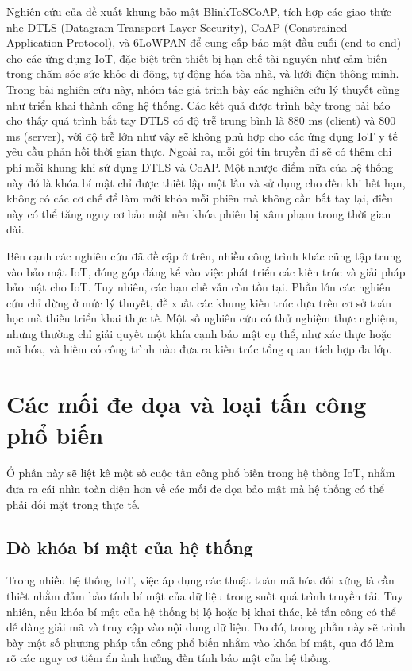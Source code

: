 Nghiên cứu của \cite{dtls} đề xuất khung bảo mật BlinkToSCoAP, tích hợp các giao thức nhẹ DTLS (Datagram Transport Layer Security), CoAP (Constrained Application Protocol), và 6LoWPAN để cung cấp bảo mật đầu cuối (end-to-end) cho các ứng dụng IoT, đặc biệt trên thiết bị hạn chế tài nguyên như cảm biến trong chăm sóc sức khỏe di động, tự động hóa tòa nhà, và lưới điện thông minh. Trong bài nghiên cứu này, nhóm tác giả trình bày các nghiên cứu lý thuyết cũng như triển khai thành công hệ thống. Các kết quả được trình bày trong bài báo cho thấy quá trình bắt tay DTLS có độ trễ trung bình là 880 ms (client) và 800 ms (server), với độ trễ lớn như vậy sẽ không phù hợp cho các ứng dụng IoT y tế yêu cầu phản hồi thời gian thực. Ngoài ra, mỗi gói tin truyền đi sẽ có thêm chi phí mỗi khung khi sử dụng DTLS và CoAP. Một nhược điểm nữa của hệ thống này đó là khóa bí mật chỉ được thiết lập một lần và sử dụng cho đến khi hết hạn, không có các cơ chế để làm mới khóa mỗi phiên mà không cần bắt tay lại, điều này có thể tăng nguy cơ bảo mật nếu khóa phiên bị xâm phạm trong thời gian dài. 

Bên cạnh các nghiên cứu đã đề cập ở trên, nhiều công trình khác cũng tập trung vào bảo mật IoT, đóng góp đáng kể vào việc phát triển các kiến trúc và giải pháp bảo mật cho IoT. Tuy nhiên, các hạn chế vẫn còn tồn tại. Phần lớn các nghiên cứu chỉ dừng ở mức lý thuyết, đề xuất các khung kiến trúc dựa trên cơ sở toán học mà thiếu triển khai thực tế. Một số nghiên cứu có thử nghiệm thực nghiệm, nhưng thường chỉ giải quyết một khía cạnh bảo mật cụ thể, như xác thực hoặc mã hóa, và hiếm có công trình nào đưa ra kiến trúc tổng quan tích hợp đa lớp. 

\section{Các mối đe dọa và loại tấn công phổ biến}
Ở phần này sẽ liệt kê một số cuộc tấn công phổ biến trong hệ thống IoT, nhằm đưa ra cái nhìn toàn diện hơn về các mối đe dọa bảo mật mà hệ thống có thể phải đối mặt trong thực tế. 
\subsection{Dò khóa bí mật của hệ thống}
Trong nhiều hệ thống IoT, việc áp dụng các thuật toán mã hóa đối xứng là cần thiết nhằm đảm bảo tính bí mật của dữ liệu trong suốt quá trình truyền tải. Tuy nhiên, nếu khóa bí mật của hệ thống bị lộ hoặc bị khai thác, kẻ tấn công có thể dễ dàng giải mã và truy cập vào nội dung dữ liệu. Do đó, trong phần này sẽ trình bày một số phương pháp tấn công phổ biến nhắm vào khóa bí mật, qua đó làm rõ các nguy cơ tiềm ẩn ảnh hưởng đến tính bảo mật của hệ thống.
